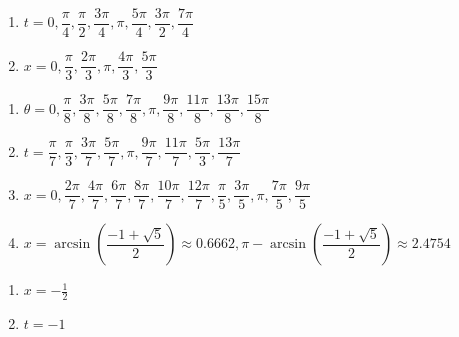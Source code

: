 \documentclass{ximera}
\begin{document}
\begin{multicols}{2}

\begin{enumerate}

\setcounter{enumi}{\value{HW}}

\item  $t = 0, \dfrac{\pi}{4}, \dfrac{\pi}{2}, \dfrac{3\pi}{4}, \pi, \dfrac{5\pi}{4}, \dfrac{3\pi}{2}, \dfrac{7\pi}{4}$
\item $x = 0, \dfrac{\pi}{3}, \dfrac{2\pi}{3}, \pi, \dfrac{4\pi}{3}, \dfrac{5\pi}{3}$

\setcounter{HW}{\value{enumi}}

\end{enumerate}

\end{multicols}

\begin{enumerate}

\setcounter{enumi}{\value{HW}}

\item $\theta = 0, \dfrac{\pi}{8}, \dfrac{3\pi}{8}, \dfrac{5\pi}{8}, \dfrac{7\pi}{8}, \pi, \dfrac{9\pi}{8}, \dfrac{11\pi}{8}, \dfrac{13\pi}{8}, \dfrac{15\pi}{8}$

\item $t = \dfrac{\pi}{7}, \dfrac{\pi}{3}, \dfrac{3\pi}{7}, \dfrac{5\pi}{7}, \pi, \dfrac{9\pi}{7}, \dfrac{11\pi}{7}, \dfrac{5\pi}{3}, \dfrac{13\pi}{7}$ 

\item $x = 0, \dfrac{2\pi}{7}, \dfrac{4\pi}{7}, \dfrac{6\pi}{7}, \dfrac{8\pi}{7}, \dfrac{10\pi}{7}, \dfrac{12\pi}{7}, \dfrac{\pi}{5}, \dfrac{3\pi}{5}, \pi, \dfrac{7\pi}{5}, \dfrac{9\pi}{5}$ 

\item $x = \arcsin \left( \dfrac{-1 + \sqrt{5}}{2} \right) \approx 0.6662, \pi - \arcsin \left( \dfrac{-1 + \sqrt{5}}{2} \right) \approx 2.4754$

\setcounter{HW}{\value{enumi}}

\end{enumerate}

\begin{multicols}{2}
\begin{enumerate}
\setcounter{enumi}{\value{HW}}

\item $x = -\frac{1}{2}$
\item $t=-1$ 

\setcounter{HW}{\value{enumi}}
\end{enumerate}
\end{multicols}
\end{document}
